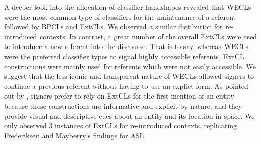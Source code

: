 \documentclass[review]{elsarticle} %
\begin{document}
A deeper look into the allocation of classifier handshapes revealed that
WECLs were the most common type of classifiers for the maintenance of a
referent followed by BPCLs and ExtCLs. We observed a similar distibution
for re-introduced contexts. In contrast, a great number of the overall
ExtCLs were used to introduce a new referent into the discourse. That is
to say, whereas WECLs were the preferred classifier types to signal
highly accessible referents, ExtCL constructions were mainly used for
referents which were not easily accessible. We suggest that the less
iconic and transparent nature of WECLs allowed signers to continue a
previous referent without having to use an explict form. As pointed out
by \citet{czubek2017}, signers prefer to rely on ExtCLs for the first
mention of an entity because these constructions are informative and
explicit by nature, and they provide visual and descriptive cues about
an entity and its location in space. We only observed 3 instances of
ExtCLs for re-introduced contexts, replicating Frederiksen and
Mayberry's \citeyearpar{frederiksen2019} findings for ASL.
\end{document}
